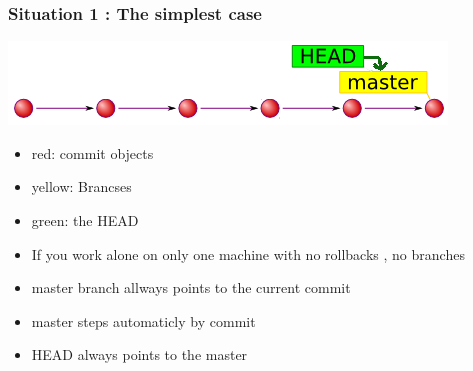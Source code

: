 \documentclass[aspectratio=169]{beamer}
\begin{document}
\begin{frame}
\frametitle<presentation>{Situation 1 : The simplest case}


	\noindent\begin{minipage}{0.4\textwidth}%
	\includegraphics[width=\linewidth]{pictures/git-mater-head-simplest.png}
	
	 \begin{itemize}
		  \item red: commit objects 
		  \item yellow: Brancses 
		  \item green: the HEAD
  	  \end{itemize}
	
	\end{minipage}%
	\hfill%
	\begin{minipage}{0.55\textwidth}\raggedleft
	  \begin{itemize}
		  \item If you work alone on only one machine with no rollbacks , no branches
		  \item master branch allways points to the current commit
		  \item master  steps automaticly by commit
		  \item HEAD always points to the master
  	  \end{itemize}
	
	\end{minipage}
	
	 
	
\end{frame}
\end{document}
